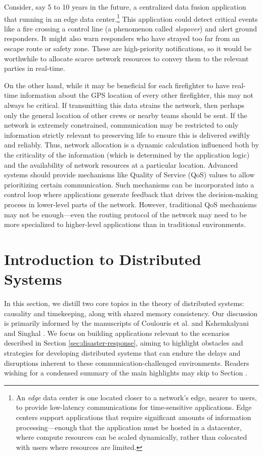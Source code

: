 \documentclass[]             %
{NASA}                       %
\theoremstyle{definition}
\begin{document}
Consider, say 5 to 10 years in the future, a centralized data fusion
application that running in an edge data center.\footnote{An
  \emph{edge} data center is one located closer to a network's edge,
  nearer to users, to provide low-latency communications for
  time-sensitive applications. Edge centers support applications that
  require significant amounts of information processing---enough that
  the application must be hosted in a datacenter, where compute
  resources can be scaled dynamically, rather than colocated with
  users where resources are limited.} This application could detect
critical events like a fire crossing a control line (a phenomenon
called \emph{slopover}) and alert ground responders. It might also
warn responders who have strayed too far from an escape route or
safety zone. These are high-priority notifications, so it would be
worthwhile to allocate scarce network resources to convey them to the
relevant parties in real-time.

On the other hand, while it may be beneficial for each firefighter to
have real-time information about the GPS location of every other
firefighter, this may not always be critical. If transmitting this
data strains the network, then perhaps only the general location of
other crews or nearby teams should be sent. If the network is
extremely constrained, communication may be restricted to only
information strictly relevant to preserving life to ensure this is
delivered swiftly and reliably. Thus, network allocation is a dynamic
calculation influenced both by the criticality of the information
(which is determined by the application logic) and the availability of
network resources at a particular location. Advanced systems should
provide mechanisms like Quality of Service (QoS) values to allow
prioritizing certain communication. Such mechanisms can be
incorporated into a control loop where applications generate feedback
that drives the decision-making process in lower-level parts of the
network. However, traditional QoS mechanisms may not be enough---even
the routing protocol of the network may need to be more specialized to
higher-level applications than in traditional environments.


\section{Introduction to Distributed Systems}
\label{sec:background}
In this section, we distill two core topics in the theory of
distributed systems: causality and timekeeping, along with shared
memory consistency.  Our discussion is primarily informed by the
manuscripts of Coulouris et al.  \cite{coulouris2005distributed} and
Kshemkalyani and Singhal \cite{kshemkalyani_singhal_2008}. We focus on
building applications relevant to the scenarios described in Section
\ref{sec:disaster-response}, aiming to highlight obstacles and
strategies for developing distributed systems that can endure the
delays and disruptions inherent to these communication-challenged
environments. Readers wishing for a condensed summary of the main
highlights may skip to Section \label{ssec:background-summary}.
\end{document}
